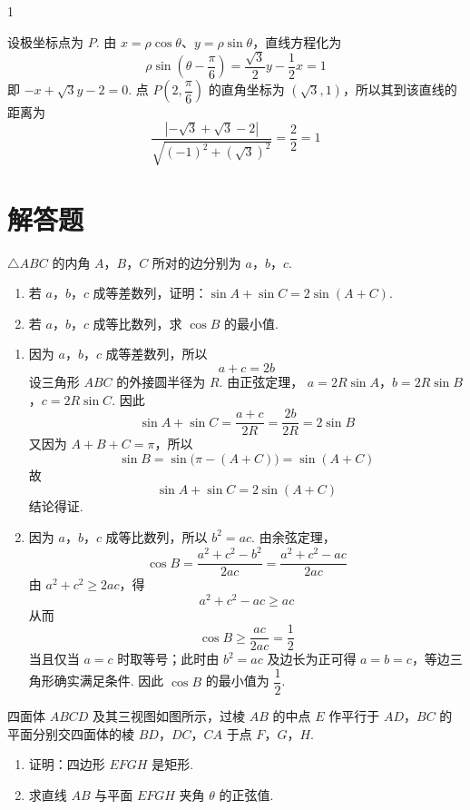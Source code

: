 \begin{answer}
1
\end{answer}

\begin{solution}
设极坐标点为 \(P\). 由 \(x=\rho\cos\theta\)、\(y=\rho\sin\theta\)，直线方程化为
\[
\rho\sin\left(\theta-\frac{\pi}{6}\right)
=\frac{\sqrt3}{2}y-\frac12x=1
\]
即 \(-x+\sqrt3y-2=0\). 点 \(P\left(2,\dfrac{\pi}{6}\right)\) 的直角坐标为 \((\sqrt3,1)\)，所以其到该直线的距离为
\[
\frac{\left|-\sqrt3+\sqrt3-2\right|}{\sqrt{(-1)^2+(\sqrt3)^2}}
=\frac{2}{2}=1
\]
\end{solution}

\section{解答题}

\begin{problem}
\(\triangle ABC\) 的内角 \(A\)，\(B\)，\(C\) 所对的边分别为 \(a\)，\(b\)，\(c\).
\begin{enumerate}
\item 若 \(a\)，\(b\)，\(c\) 成等差数列，证明：\(\sin A + \sin C = 2 \sin (A + C)\).
\item 若 \(a\)，\(b\)，\(c\) 成等比数列，求 \(\cos B\) 的最小值.
\end{enumerate}
\end{problem}

\begin{solution}
\begin{enumerate}
\item 因为 \(a\)，\(b\)，\(c\) 成等差数列，所以
\[
a+c=2b
\]
设三角形 \(ABC\) 的外接圆半径为 \(R\). 由正弦定理，
\(a=2R\sin A\)，\(b=2R\sin B\)，\(c=2R\sin C\).
因此
\[
\sin A+\sin C=\frac{a+c}{2R}=\frac{2b}{2R}=2\sin B
\]
又因为 \(A+B+C=\pi\)，所以
\[
\sin B=\sin\bigl(\pi-(A+C)\bigr)=\sin(A+C)
\]
故
\[
\sin A+\sin C=2\sin(A+C)
\]
结论得证.

\item 因为 \(a\)，\(b\)，\(c\) 成等比数列，所以 \(b^2=ac\). 由余弦定理，
\[
\cos B=\frac{a^2+c^2-b^2}{2ac}
=\frac{a^2+c^2-ac}{2ac}
\]
由 \(a^2+c^2\geqslant 2ac\)，得
\[
a^2+c^2-ac\geqslant ac
\]
从而
\[
\cos B\geqslant\frac{ac}{2ac}=\frac12
\]
当且仅当 \(a=c\) 时取等号；此时由 \(b^2=ac\) 及边长为正可得 \(a=b=c\)，等边三角形确实满足条件. 因此 \(\cos B\) 的最小值为 \(\dfrac12\).
\end{enumerate}
\end{solution}

\begin{problem}
四面体 \(ABCD\) 及其三视图如图所示，过棱 \(AB\) 的中点 \(E\) 作平行于 \(AD\)，\(BC\) 的平面分别交四面体的棱 \(BD\)，\(DC\)，\(CA\) 于点 \(F\)，\(G\)，\(H\).

\begin{enumerate}
\item 证明：四边形 \(EFGH\) 是矩形.
\item 求直线 \(AB\) 与平面 \(EFGH\) 夹角 \(\theta\) 的正弦值.
\end{enumerate}

\end{problem}

